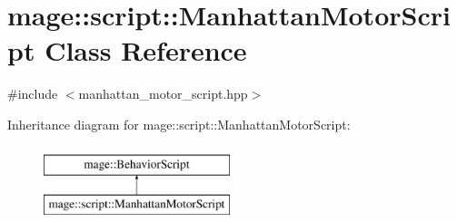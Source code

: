 \hypertarget{classmage_1_1script_1_1_manhattan_motor_script}{}\section{mage\+:\+:script\+:\+:Manhattan\+Motor\+Script Class Reference}
\label{classmage_1_1script_1_1_manhattan_motor_script}


{\ttfamily \#include $<$manhattan\+\_\+motor\+\_\+script.\+hpp$>$}

Inheritance diagram for mage\+:\+:script\+:\+:Manhattan\+Motor\+Script\+:\begin{figure}[H]
\begin{center}
\leavevmode
\includegraphics[height=2.000000cm]{classmage_1_1script_1_1_manhattan_motor_script}
\end{center}
\end{figure}
